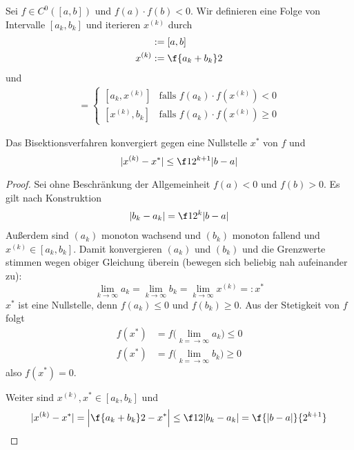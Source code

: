 \documentclass[11pt]{scrartcl}
\begin{document}
\begin{df}[Bisektionsverfahren] \label{3.1}
	Sei $f \in C^0([a,b])$ und $f(a) \cdot f(b) < 0$.
	Wir definieren eine Folge von Intervalle $[a_k, b_k]$ und iterieren $x^{(k)}$ durch
	\begin{align*}
		[a_0, b_0] &:= [a,b] \\
		x^{(k)} &:= \f {a_k + b_k}2
	\end{align*}
	und
	\begin{align*}
		[a_{k+1}, b_{k+1}] = \begin{cases}
			[a_k, x^{(k)}] & \text{falls } f(a_k) \cdot f(x^{(k)}) < 0 \\
			[x^{(k)}, b_k] & \text{falls } f(a_k) \cdot f(x^{(k)}) \ge 0
		\end{cases}
	\end{align*}
\end{df}

\begin{st} \label{3.2}
	Das Bisektionsverfahren konvergiert gegen eine Nullstelle $x^*$ von $f$ und
	\[
		|x^{(k)} - x^*| \le \f 1{2^{k+1}} |b-a|
	\]
	\begin{proof}
		Sei ohne Beschränkung der Allgemeinheit $f(a) < 0$ und $f(b) > 0$.
		Es gilt nach Konstruktion
		\begin{align*}
			|b_k - a_k| &= \f 1{2^k} |b-a| \\
		\end{align*}
		Außerdem sind $(a_k)$ monoton wachsend und $(b_k)$ monoton fallend und $x^{(k)} \in [a_k,b_k]$.
		Damit konvergieren $(a_k)$ und $(b_k)$ und die Grenzwerte stimmen wegen obiger Gleichung überein (bewegen sich beliebig nah aufeinander zu):
		\[
			\lim_{k\to \infty} a_k = \lim_{k\to \infty} b_k = \lim_{k\to \infty} x^{(k)} =: x^*
		\]
		$x^*$ ist eine Nullstelle, denn $f(a_k) \le 0$ und $f(b_k) \ge 0$.
		Aus der Stetigkeit von $f$ folgt
		\begin{align*}
			f(x^*) &= f\big( \lim_{k=\to \infty}a_k \big) \le 0 \\
			f(x^*) &= f\big( \lim_{k=\to \infty}b_k \big) \ge 0
		\end{align*}
		also $f(x^*) = 0$.

		Weiter sind $x^{(k)}, x^* \in [a_k, b_k]$ und
		\begin{align*}
			|x^{(k)} - x^*| = \Big| \f {a_k + b_k}2 - x^* \Big| \le \f 12 |b_k-a_k| = \f {|b-a|}{2^{k+1}}
		\end{align*}
	\end{proof}
\end{st}
\end{document}
